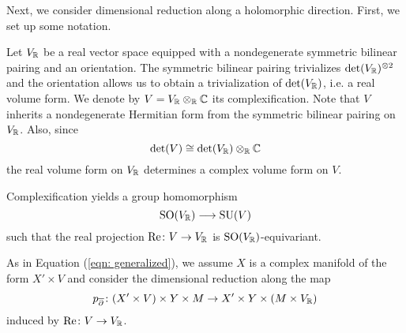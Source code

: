 \documentclass[10pt, oneside]{article}
\newcommand{\Hod}{\mathrm{Hod}}
\renewcommand{\Re}{\mathrm{Re}}
\begin{document}

Next, we consider dimensional reduction along a holomorphic direction. 
First, we set up some notation.

Let $V_\mathbb R$ be a real vector space equipped with a nondegenerate symmetric bilinear pairing and an orientation. 
The symmetric bilinear pairing trivializes $\det(V_\mathbb R)^{\otimes 2}$ and the orientation allows us to obtain a trivialization of $\det(V_\mathbb R)$, i.e. a real volume form. 
We denote by $V=V_\mathbb R\otimes_{\mathbb R}\mathbb C$ its complexification. 
Note that $V$ inherits a nondegenerate Hermitian form from the symmetric bilinear pairing on $V_\mathbb R$. 
Also, since
\[\det(V)\cong \det(V_\mathbb R)\otimes_{\mathbb R}\mathbb C\]
the real volume form on $V_\mathbb R$ determines a complex volume form on $V$. 

Complexification yields a group homomorphism
\begin{equation}
\mathrm{SO}(V_\mathbb R)\longrightarrow \mathrm{SU}(V)
\label{eq:SOtoSU}
\end{equation}
such that the real projection $\Re\colon V\rightarrow V_\RR$ is $\mathrm{SO}(V_\mathbb R)$-equivariant.

As in Equation (\ref{eqn: generalized}), we assume $X$ is a complex manifold of the form $X' \times V$ and consider the dimensional reduction along the map
\[
p_{\overline{\partial}}\colon (X' \times V) \times Y \times M \to X' \times Y \times (M \times V_\mathbb R)
\]
induced by ${\rm Re}\colon V \to V_{\mathbb R}$.
\end{document}
